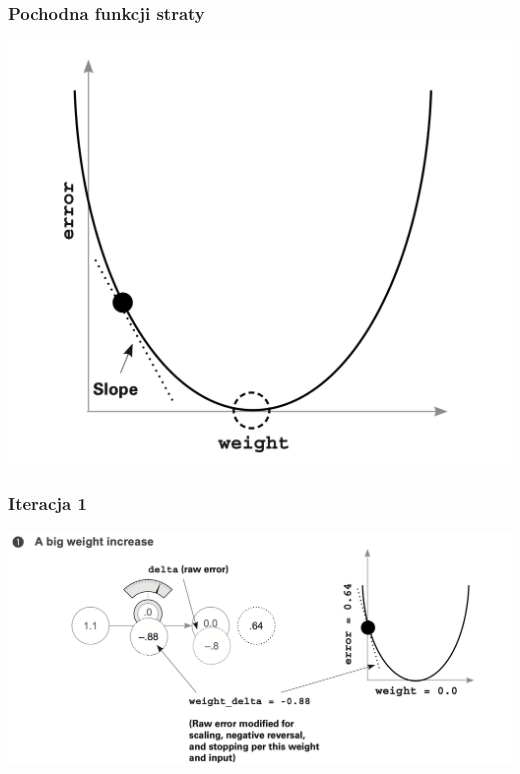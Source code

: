 \documentclass[smaller]{beamer}
\begin{document}

\begin{frame}
\frametitle{Pochodna funkcji straty}
    \centering
    \includegraphics[width=\textwidth,height=0.8\textheight,keepaspectratio]{../manifest/slope.png}
\end{frame}


\begin{frame}
\frametitle{Iteracja 1}
    \centering
    \includegraphics[width=\textwidth,height=0.8\textheight,keepaspectratio]{../manifest/optim-1.png}
\end{frame}

\end{document}

